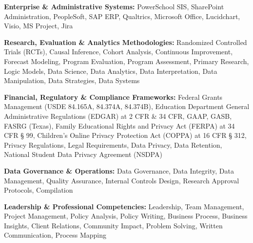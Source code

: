 \documentclass[
  11pt,
]
{article}
\begin{document}
\textbf{Enterprise \& Administrative Systems:} PowerSchool SIS,
SharePoint Administration, PeopleSoft, SAP ERP, Qualtrics, Microsoft
Office, Lucidchart, Visio, MS Project, Jira

\textbf{Research, Evaluation \& Analytics Methodologies:} Randomized
Controlled Trials (RCTs), Causal Inference, Cohort Analysis, Continuous
Improvement, Forecast Modeling, Program Evaluation, Program Assessment,
Primary Research, Logic Models, Data Science, Data Analytics, Data
Interpretation, Data Manipulation, Data Strategies, Data Systems

\textbf{Financial, Regulatory \& Compliance Frameworks:} Federal Grants
Management (USDE 84.165A, 84.374A, 84.374B), Education Department
General Administrative Regulations (EDGAR) at 2 CFR \& 34 CFR, GAAP,
GASB, FASRG (Texas), Family Educational Rights and Privacy Act (FERPA)
at 34 CFR § 99, Children's Online Privacy Protection Act (COPPA) at 16
CFR § 312, Privacy Regulations, Legal Requirements, Data Privacy, Data
Retention, National Student Data Privacy Agreement (NSDPA)

\textbf{Data Governance \& Operations:} Data Governance, Data Integrity,
Data Management, Quality Assurance, Internal Controls Design, Research
Approval Protocols, Compilation

\textbf{Leadership \& Professional Competencies:} Leadership, Team
Management, Project Management, Policy Analysis, Policy Writing,
Business Process, Business Insights, Client Relations, Community Impact,
Problem Solving, Written Communication, Process Mapping
\end{document}
